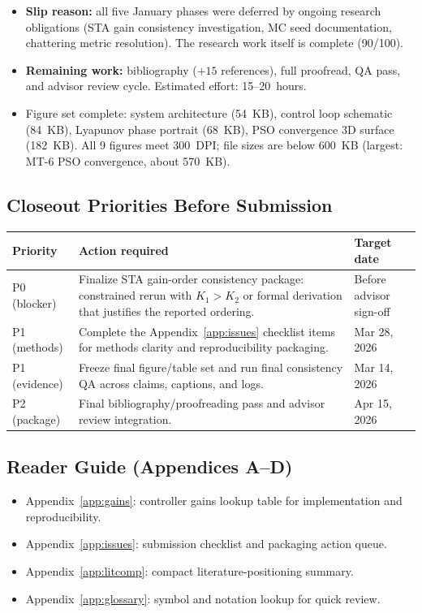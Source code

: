 \documentclass[10pt, a4paper]{article}
\begin{document}
\begin{itemize}[leftmargin=1.5em,itemsep=0.2em]
  \item \textbf{Slip reason:} all five January phases were deferred by ongoing
  research obligations (STA gain consistency investigation, MC seed documentation,
  chattering metric resolution).  The research work itself is complete (90/100).
  \item \textbf{Remaining work:} bibliography ($+15$ references), full proofread,
  QA pass, and advisor review cycle.  Estimated effort: 15--20~hours.
  \item Figure set complete: system architecture (54~KB), control loop schematic
  (84~KB), Lyapunov phase portrait (68~KB), PSO convergence 3D surface (182~KB).
  All 9 figures meet 300~DPI; file sizes are below 600~KB
  (largest: MT-6 PSO convergence, about 570~KB).
\end{itemize}

\subsection{Closeout Priorities Before Submission}
\begin{center}
\small
\begin{tabularx}{\columnwidth}{@{}p{2.1cm}Xp{2.2cm}@{}}
\toprule
\textbf{Priority} & \textbf{Action required} & \textbf{Target date} \\
\midrule
P0 (blocker) & Finalize STA gain-order consistency package: constrained rerun with $K_1>K_2$ or formal derivation that justifies the reported ordering. & Before advisor sign-off \\
P1 (methods) & Complete the Appendix~\ref{app:issues} checklist items for methods clarity and reproducibility packaging. & Mar 28, 2026 \\
P1 (evidence) & Freeze final figure/table set and run final consistency QA across claims, captions, and logs. & Mar 14, 2026 \\
P2 (package) & Final bibliography/proofreading pass and advisor review integration. & Apr 15, 2026 \\
\bottomrule
\end{tabularx}
\end{center}

\subsection{Reader Guide (Appendices A--D)}
\begin{itemize}[leftmargin=1.5em,itemsep=0.2em]
  \item Appendix~\ref{app:gains}: controller gains lookup table for implementation and reproducibility.
  \item Appendix~\ref{app:issues}: submission checklist and packaging action queue.
  \item Appendix~\ref{app:litcomp}: compact literature-positioning summary.
  \item Appendix~\ref{app:glossary}: symbol and notation lookup for quick review.
\end{itemize}
\end{document}
